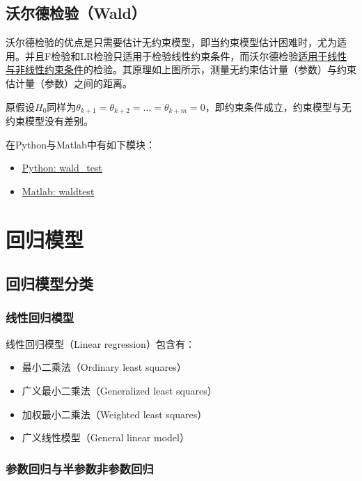 \documentclass[11pt]{article}
\begin{document}
\subsection{沃尔德检验（Wald）}

沃尔德检验的优点是只需要估计无约束模型，即当约束模型估计困难时，尤为适用。并且F检验和LR检验只适用于检验线性约束条件，而沃尔德检验\uline{适用于线性与非线性约束条件}的检验。其原理如上图所示，测量无约束估计量（参数）与约束估计量（参数）之间的距离。

原假设$H_0$同样为$\theta_{k+1}=\theta_{k+2}=\dots=\theta_{k+m}=0$，即约束条件成立，约束模型与无约束模型没有差别。

\begin{remark}
    在Python与Matlab中有如下模块：
    \begin{itemize}
        \item \href{https://www.statsmodels.org/stable/generated/statsmodels.regression.linear_model.RegressionResults.wald_test.html}{Python: wald\_test}
        \item \href{https://www.mathworks.com/help/econ/waldtest.html}{Matlab: waldtest}
    \end{itemize}
\end{remark}

\section{回归模型}

\subsection{回归模型分类}

\subsubsection*{线性回归模型}
线性回归模型（Linear regression）包含有：
\begin{itemize}
    \item 最小二乘法（Ordinary least squares）
    \item 广义最小二乘法（Generalized least squares）
    \item 加权最小二乘法（Weighted least squares）
    \item 广义线性模型（General linear model）
\end{itemize}

\subsubsection*{参数回归与半参数非参数回归}
\end{document}
